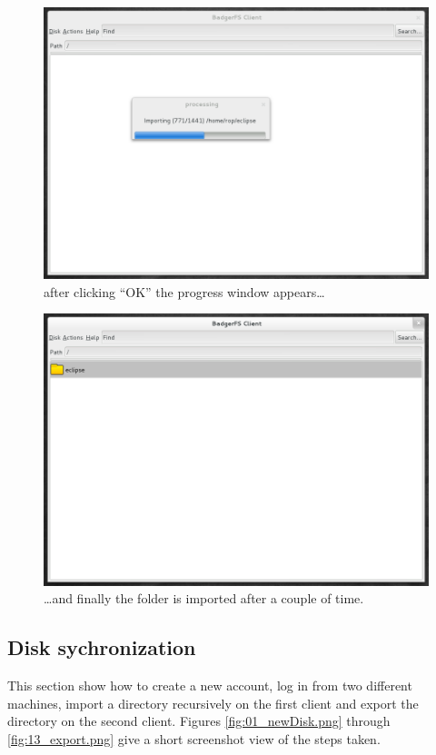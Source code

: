 \begin{figure}[h!]
\centering
\includegraphics[width=1\textwidth]{figures/05_quickstart.png}
\caption{after clicking ``OK'' the progress window appears\ldots}
\label{fig:05_quickstart}
\end{figure}

\begin{figure}[h!]
\centering
\includegraphics[width=1\textwidth]{figures/06_quickstart.png}
\caption{\ldots and finally the folder is imported after a couple of time.}
\label{fig:06_quickstart}
\end{figure}


\subsection{Disk sychronization}
This section show how to create a new account, log in from two different
machines, import a directory recursively on the first client
and export the directory on the second client. Figures \ref{fig:01_newDisk.png}
through \ref{fig:13_export.png} give a short screenshot view of the steps taken.

